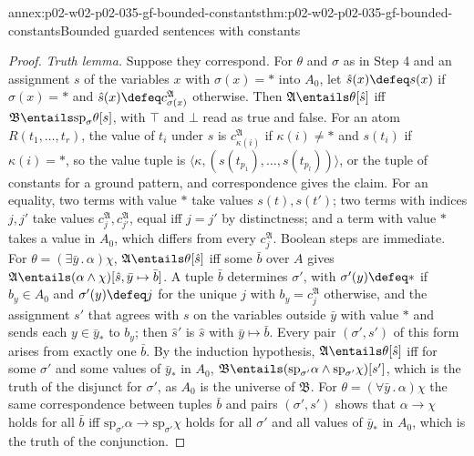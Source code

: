 \begin{annexitem}{annex:p02-w02-p02-035-gf-bounded-constants}{thm:p02-w02-p02-035-gf-bounded-constants}{Bounded guarded sentences with constants}
\begin{proof}
\emph{Truth lemma.}  Suppose they correspond.  For \(\theta\) and \(\sigma\) as
in Step 4 and an assignment \(s\) of the variables \(x\) with
\(\sigma(x)=\ast\) into \(A_0\), let \(\hat s(x)\defeq s(x)\) if
\(\sigma(x)=\ast\) and \(\hat s(x)\defeq c_{\sigma(x)}^{\mathfrak A}\)
otherwise.  Then \(\mathfrak A\entails\theta[\hat s]\) iff
\(\mathfrak B\entails\mathrm{sp}_\sigma\theta[s]\), with \(\top\) and \(\bot\)
read as true and false.  For an atom \(R(t_1,\ldots,t_r)\), the value of
\(t_i\) under \(\hat s\) is \(c_{\kappa(i)}^{\mathfrak A}\) if
\(\kappa(i)\neq\ast\) and \(s(t_i)\) if \(\kappa(i)=\ast\), so the value tuple
is \(\langle\kappa,(s(t_{p_1}),\ldots,s(t_{p_l}))\rangle\), or the tuple of
constants for a ground pattern, and correspondence gives the claim.  For an
equality, two terms with value \(\ast\) take values \(s(t),s(t')\); two terms
with indices \(j,j'\) take values \(c_j^{\mathfrak A},c_{j'}^{\mathfrak A}\),
equal iff \(j=j'\) by distinctness; and a term with value \(\ast\) takes a
value in \(A_0\), which differs from every \(c_j^{\mathfrak A}\).  Boolean
steps are immediate.  For \(\theta=(\exists\bar y\,.\,\alpha)\chi\),
\(\mathfrak A\entails\theta[\hat s]\) iff some \(\bar b\) over \(A\) gives
\(\mathfrak A\entails(\alpha\land\chi)[\hat s,\bar y\mapsto\bar b]\).  A tuple
\(\bar b\) determines \(\sigma'\), with \(\sigma'(y)\defeq\ast\) if
\(b_y\in A_0\) and \(\sigma'(y)\defeq j\) for the unique \(j\) with
\(b_y=c_j^{\mathfrak A}\) otherwise, and the assignment \(s'\) that agrees with
\(s\) on the variables outside \(\bar y\) with value \(\ast\) and sends each
\(y\in\bar y_{\ast}\) to \(b_y\); then \(\hat s'\) is \(\hat s\) with
\(\bar y\mapsto\bar b\).  Every pair \((\sigma',s')\) of this form arises from
exactly one \(\bar b\).  By the induction hypothesis,
\(\mathfrak A\entails\theta[\hat s]\) iff for some \(\sigma'\) and some values
of \(\bar y_{\ast}\) in \(A_0\),
\(\mathfrak B\entails(\mathrm{sp}_{\sigma'}\alpha\land\mathrm{sp}_{\sigma'}\chi)[s']\),
which is the truth of the disjunct for \(\sigma'\), as \(A_0\) is the universe
of \(\mathfrak B\).  For \(\theta=(\forall\bar y\,.\,\alpha)\chi\) the same
correspondence between tuples \(\bar b\) and pairs \((\sigma',s')\) shows that
\(\alpha\to\chi\) holds for all \(\bar b\) iff
\(\mathrm{sp}_{\sigma'}\alpha\to\mathrm{sp}_{\sigma'}\chi\) holds for all
\(\sigma'\) and all values of \(\bar y_{\ast}\) in \(A_0\), which is the truth
of the conjunction.


\end{proof}
\end{annexitem}
